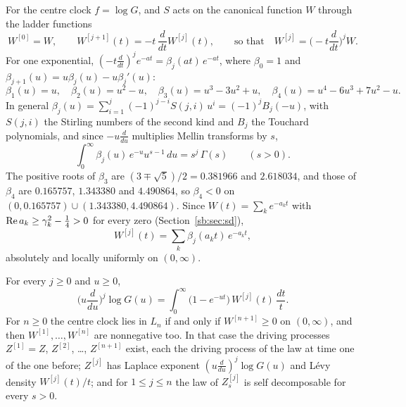 For the centre clock $f=\log G$, and $S$ acts on the canonical function $W$ through the ladder functions
\[
W^{[0]}=W,\qquad W^{[j+1]}(t)=-t\,\frac d{dt}W^{[j]}(t),\qquad\text{so that}\quad W^{[j]}=\Big(-t\frac d{dt}\Big)^jW .
\]
For one exponential, $(-t\frac d{dt})^je^{-at}=\beta_j(at)\,e^{-at}$, where $\beta_0=1$ and $\beta_{j+1}(u)=u\beta_j(u)-u\beta_j'(u)$:
\[
\beta_1(u)=u,\quad\beta_2(u)=u^2-u,\quad\beta_3(u)=u^3-3u^2+u,\quad\beta_4(u)=u^4-6u^3+7u^2-u .
\]
In general $\beta_j(u)=\sum_{i=1}^j(-1)^{j-i}S(j,i)\,u^i=(-1)^jB_j(-u)$, with $S(j,i)$ the Stirling numbers of the second kind and $B_j$ the Touchard polynomials, and since $-u\frac d{du}$ multiplies Mellin transforms by $s$,
\begin{equation}\label{pk:eq:mellin}
\int_0^\infty\beta_j(u)\,e^{-u}u^{s-1}\,du=s^j\,\Gamma(s)\qquad(s>0).
\end{equation}
The positive roots of $\beta_3$ are $(3\mp\sqrt5)/2=0.381966$ and $2.618034$, and those of $\beta_4$ are $0.165757$, $1.343380$ and $4.490864$, so $\beta_4<0$ on $(0,0.165757)\cup(1.343380,4.490864)$. Since $W(t)=\sum_ke^{-a_kt}$ with $\operatorname{Re} a_k\ge\gamma_k^2-\frac14>0$ for every zero (Section~\ref{sb:sec:sd}),
\begin{equation}\label{pk:eq:Wj}
W^{[j]}(t)=\sum_k\beta_j(a_kt)\,e^{-a_kt},
\end{equation}
absolutely and locally uniformly on $(0,\infty)$.

\begin{lemma}\label{pk:lem:urbanik}
For every $j\ge0$ and $u\ge0$,
\begin{equation}\label{pk:eq:Sj}
\Big(u\frac d{du}\Big)^j\log G(u)=\int_0^\infty\big(1-e^{-ut}\big)\,W^{[j]}(t)\,\frac{dt}t .
\end{equation}
For $n\ge0$ the centre clock lies in $L_n$ if and only if $W^{[n+1]}\ge0$ on $(0,\infty)$, and then $W^{[1]},\dots,W^{[n]}$ are nonnegative too. In that case the driving processes $Z^{[1]}=Z$, $Z^{[2]}$, \dots, $Z^{[n+1]}$ exist, each the driving process of the law at time one of the one before; $Z^{[j]}$ has Laplace exponent $(u\frac d{du})^j\log G(u)$ and L\'evy density $W^{[j]}(t)/t$; and for $1\le j\le n$ the law of $Z^{[j]}_s$ is self decomposable for every $s>0$.
\end{lemma}

